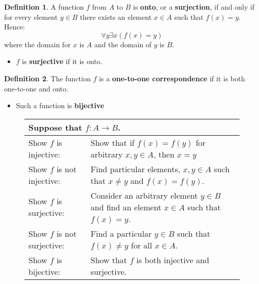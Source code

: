 \documentclass[article, 12pt]{article}
\theoremstyle{definition}
\newtheorem{definition}{Definition}[subsection]
\begin{document}
    \begin{definition}
        A function $f$ from $A$ to $B$ is \textbf{onto}, or a \textbf{surjection}, if and only if for every element $y \in B$ there exists an element $x \in A$ such that $f(x) = y$. Hence:
        \begin{equation*}
            \forall y \exists x (f(x) = y)
        \end{equation*}
        where the domain for $x$ is $A$ and the domain of $y$ is $B$.
        \begin{itemize}
            \item $f$ is \textbf{surjective} if it is onto.
        \end{itemize}
    \end{definition}
    \begin{definition}
        The function $f$ is a \textbf{one-to-one correspondence} if it is both one-to-one and onto. 
        \begin{itemize}
            \item Such a function is \textbf{bijective}
        \end{itemize}
        \label{def:one-to-one-correspondence}
    \end{definition}
    \begin{figure}[H]
        \centering
        {\renewcommand{\arraystretch}{1.5}
        \begin{tabular}{|l p{25em}|}
            \hline
            \multicolumn{2}{|l|}{Suppose that $f: A \to B$.} \\
            \hline
            Show $f$ is injective: & Show that if $f(x) = f(y)$ for arbitrary $x,y \in A$, then $x = y$ \\
            Show $f$ is not injective: & Find particular elements, $x,y \in A$ such that $x \neq y$ and $f(x)=f(y)$. \\
            Show $f$ is surjective: & Consider an arbitrary element $y \in B$ and find an element $x \in A$ such that $f(x) = y$. \\
            Show $f$ is not surjective: & Find a particular $y \in B$ such that $f(x) \neq y$ for all $x \in A$. \\
            Show $f$ is bijective: & Show that $f$ is both injective and surjective. \\
            \hline
        \end{tabular}}
    \end{figure}
\end{document}
